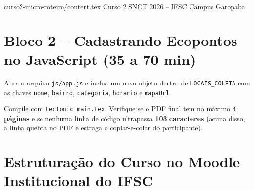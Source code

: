 \begin{codigo}[txt]{curso2-micro-roteiro/content.tex}
  {Curso 2 SNCT 2026 -- IFSC Campus Garopaba}
  {\hspace{4pt}
   \hspace{4pt}
   }

\vspace{0.3em}

\begin{mapaAula}
\end{mapaAula}

\section{Bloco 2 -- Cadastrando Ecopontos no JavaScript (35 a 70 min)}
Abra o arquivo \texttt{js/app.js} e inclua um novo objeto dentro de \texttt{LOCAIS\_COLETA}
com as chaves \texttt{nome}, \texttt{bairro}, \texttt{categoria}, \texttt{horario} e \texttt{mapaUrl}.
\end{codigo}

\begin{boxTeste}
Compile com \texttt{tectonic main.tex}. Verifique se o PDF final tem no máximo \textbf{4 páginas} e se nenhuma linha de código ultrapassa \textbf{103 caracteres} (acima disso, a linha quebra no PDF e estraga o copiar-e-colar do participante).
\end{boxTeste}

\section{Estruturação do Curso no Moodle Institucional do IFSC}\label{sec:moodle}

